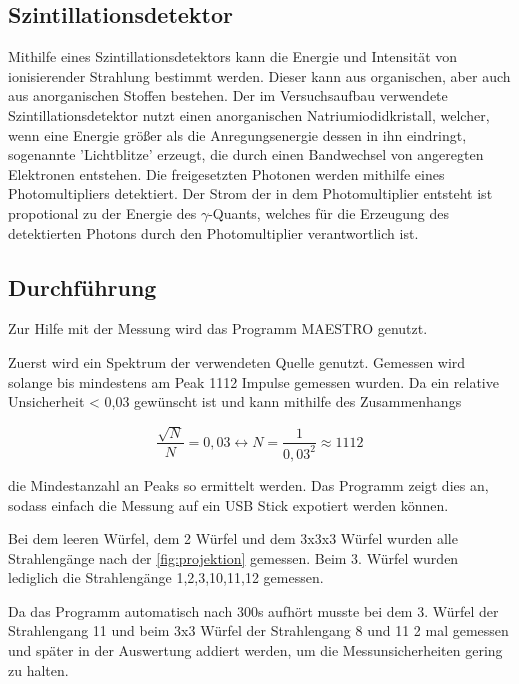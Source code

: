 \subsection{Szintillationsdetektor}
Mithilfe eines Szintillationsdetektors kann die Energie und Intensität von ionisierender Strahlung bestimmt werden. Dieser kann aus organischen, aber auch aus anorganischen Stoffen
bestehen. Der im Versuchsaufbau verwendete Szintillationsdetektor nutzt einen anorganischen Natriumiodidkristall, welcher, wenn eine Energie größer als die Anregungsenergie 
dessen in ihn eindringt, sogenannte 'Lichtblitze' erzeugt, die durch einen Bandwechsel von angeregten Elektronen entstehen. Die freigesetzten Photonen werden mithilfe eines 
Photomultipliers detektiert. Der Strom der in dem Photomultiplier entsteht ist propotional zu der Energie des $\gamma$-Quants, welches für die Erzeugung des detektierten Photons
durch den Photomultiplier verantwortlich ist. 


\subsection{Durchführung}
Zur Hilfe mit der Messung wird das Programm MAESTRO genutzt.

\noindent
Zuerst wird ein Spektrum der verwendeten Quelle genutzt. Gemessen wird solange bis mindestens am Peak 1112 Impulse gemessen wurden. Da ein relative Unsicherheit < 0,03
gewünscht ist und kann mithilfe des Zusammenhangs

\begin{equation}
    \frac{\sqrt{N}}{N} = 0,03 \leftrightarrow N = \frac{1}{0,03^2} \approx 1112
    \label{eqn:n}
  \end{equation}
  
die Mindestanzahl an Peaks so ermittelt werden. Das Programm zeigt dies an, sodass einfach die Messung auf ein USB Stick expotiert werden können.

\noindent
Bei dem leeren Würfel, dem 2 Würfel und dem 3x3x3 Würfel wurden alle Strahlengänge nach der \autoref{fig:projektion} gemessen. Beim 3. Würfel wurden lediglich die Strahlengänge
1,2,3,10,11,12 gemessen. 

\noindent
Da das Programm automatisch nach 300s aufhört musste bei dem 3. Würfel der Strahlengang 11 und beim 3x3 Würfel der Strahlengang 8 und 11 2 mal gemessen und später in der
Auswertung addiert werden, um die Messunsicherheiten gering zu halten.












